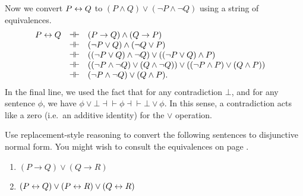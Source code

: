 Now we convert $P\leftrightarrow Q$ to $(P\wedge Q)\vee (\neg P\wedge\neg Q)$
using a string of equivalences.
\[ \begin{array}{r c l l}
     P\leftrightarrow Q & \dashv\vdash & (P\to Q)\wedge (Q\to P) & \\
             & \dashv\vdash & (\neg P\vee Q)\wedge (\neg Q\vee P) & \\
             & \dashv\vdash & ((\neg P\vee Q)\wedge\neg Q)\vee ((\neg P\vee
                        Q)\wedge P) \\
             & \dashv\vdash & ((\neg P\wedge\neg Q)\vee (Q\wedge\neg Q))\vee
                        ((\neg P\wedge P)\vee (Q\wedge P)) \\
             & \dashv\vdash & (\neg P\wedge\neg Q)\vee (Q\wedge P) .
   \end{array} \]
 In the final line, we used the fact that for any contradiction $\bot$, and
 for any sentence $\phi$, we have  $\phi\vee\bot\dashv\vdash\phi\dashv\vdash\bot\vee\phi$. In this sense, a
 contradiction acts like a zero (i.e.\ an additive identity) for the $\vee$ operation.
 

                                               
                                                          

 \begin{exercises} Use replacement-style reasoning to convert the
   following sentences to disjunctive normal form.  You might wish to
   consult the equivalences on page \pageref{equivs}.
  \begin{enumerate}
  \item $(P\to Q)\vee (Q\to R)$  
  \item $(P\leftrightarrow Q)\vee (P\leftrightarrow R)\vee (Q\leftrightarrow R)$
  \end{enumerate}
\end{exercises}




  
                               

     



